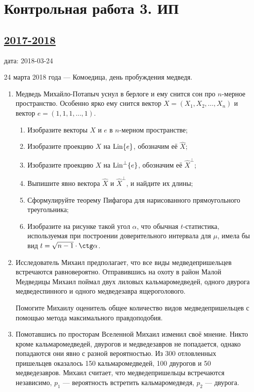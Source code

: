 \section{Контрольная работа 3. ИП}



\subsection[2017-2018]{\hyperref[sec:sol_kr_03_ip_2017_2018]{2017-2018}}
\label{sec:kr_03_ip_2017_2018}

дата: 2018-03-24

24 марта 2018 года — Комоедица, день пробуждения медведя.


\begin{enumerate}
  \item Медведь Михайло-Потапыч уснул в берлоге и ему снится сон про $n$-мерное пространство.
    Особенно ярко ему снится вектор $X=(X_1, X_2, \ldots, X_n)$ и вектор $e=(1, 1, 1, \ldots, 1)$.
    \begin{enumerate}
      \item Изобразите векторы $X$ и $e$ в $n$-мерном пространстве;
      \item Изобразите проекцию $X$ на $\operatorname{\mathrm{Lin}} \{e\}$, обозначим её $\hat X$;
      \item Изобразите проекцию $X$ на $\operatorname{\operatorname{\mathrm{Lin}}^{\perp}} \{e\}$, обозначим её $\hat X^{\perp}$;
      \item Выпишите явно вектора $\hat X$ и $\hat X^{\perp}$, и найдите их длины;
      \item Сформулируйте теорему Пифагора для нарисованного прямоугольного треугольника;
      \item Изобразите на рисунке такой угол $\alpha$, что обычная $t$-статистика, используемая при построении доверительного интервала для $\mu$, имела бы вид $t = \sqrt{n-1} \cdot \ctg \alpha$.
    \end{enumerate}

  \item Исследователь Михаил предполагает, что все виды медведепришельцев встречаются равновероятно.
    Отправившись на охоту в район Малой Медведицы Михаил поймал двух лиловых кальмаромедведей,
    одного двурога медведеспинного и одного медведезавра ящероголового.

      Помогите Михаилу оценитель общее количество видов медведепришельцев с помощью метода максимального правдоподобия.


    \item Помотавшись по просторам Вселенной Михаил изменил своё мнение.
      Никто кроме кальмаромедведей, двурогов и медведезавров не попадается, однако попадаются они явно с разной вероятностью.
      Из 300 отловленных пришельцев оказалось 150 кальмаромедведей, 100 двурогов и 50 медведезавров.
      Михаил считает, что медведепришельцы встречаются независимо, $p_1$ — вероятность встретить кальмаромедведя, $p_2$ — двурога.


\end{enumerate}
